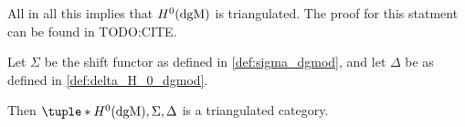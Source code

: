 All in all this implies that \( H^0(\operatorname{dgM}) \) is triangulated. The proof for this statment can be found in TODO:CITE.
\begin{theorem}
    Let \( \Sigma \) be the shift functor as defined in \autoref{def:sigma_dgmod}, and let \( \Delta \) be as defined in \autoref{def:delta_H_0_dgmod}.

    Then \( \tuple*{H^0(\dgM), \Sigma, \Delta} \) is a triangulated category.
\end{theorem}





    




